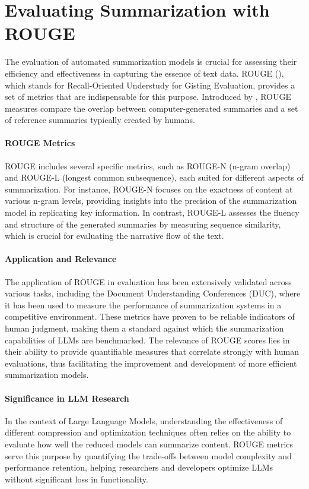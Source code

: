 \section{Evaluating Summarization with ROUGE}\label{sec:rouge}
The evaluation of automated summarization models is crucial for assessing their efficiency and effectiveness in capturing the essence of text data. ROUGE (\cite{lin-2004-rouge}), which stands for Recall-Oriented Understudy for Gisting Evaluation, provides a set of metrics that are indispensable for this purpose. Introduced by \cite{lin-2004-rouge}, ROUGE measures compare the overlap between computer-generated summaries and a set of reference summaries typically created by humans.

\paragraph{ROUGE Metrics}
ROUGE includes several specific metrics, such as ROUGE-N (n-gram overlap) and ROUGE-L (longest common subsequence), each suited for different aspects of summarization. For instance, ROUGE-N focuses on the exactness of content at various n-gram levels, providing insights into the precision of the summarization model in replicating key information. In contrast, ROUGE-L assesses the fluency and structure of the generated summaries by measuring sequence similarity, which is crucial for evaluating the narrative flow of the text.

\paragraph{Application and Relevance}
The application of ROUGE in evaluation has been extensively validated across various tasks, including the Document Understanding Conferences (DUC), where it has been used to measure the performance of summarization systems in a competitive environment. These metrics have proven to be reliable indicators of human judgment, making them a standard against which the summarization capabilities of LLMs are benchmarked. The relevance of ROUGE scores lies in their ability to provide quantifiable measures that correlate strongly with human evaluations, thus facilitating the improvement and development of more efficient summarization models.

\paragraph{Significance in LLM Research}
In the context of Large Language Models, understanding the effectiveness of different compression and optimization techniques often relies on the ability to evaluate how well the reduced models can summarize content. ROUGE metrics serve this purpose by quantifying the trade-offs between model complexity and performance retention, helping researchers and developers optimize LLMs without significant loss in functionality.
